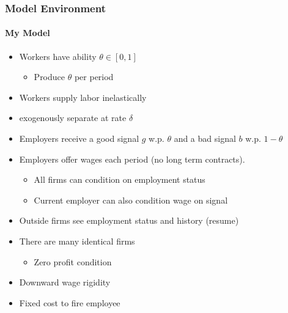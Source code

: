 \documentclass{beamer}
\begin{document}
\begin{frame}
\frametitle{Model Environment}
\framesubtitle{My Model}
\begin{itemize}
	\setlength{\itemsep}{1mm}
	\item Workers have ability $\theta \in [0,1]$ 
	\begin{itemize}
		\setlength{\itemsep}{1mm}
		\item Produce $\theta$ per period 		
	\end{itemize}
	\item Workers supply labor inelastically
	\item exogenously separate at rate $\delta$ 
	\item Employers receive a good signal $g$ w.p. $\theta$ and a bad signal $b$ w.p. $1-\theta$
	\item Employers offer wages each period (no long term contracts).
	\begin{itemize}
		\item All firms can condition on employment status 
		\item Current employer can also condition wage on signal
	\end{itemize}
	\item Outside firms see employment status and history (resume)
	\item There are many identical firms
	\begin{itemize}
		\item Zero profit condition
	\end{itemize} 
	\item Downward wage rigidity 
	\item Fixed cost to fire employee
	
\end{itemize}
\end{frame}
\end{document}
